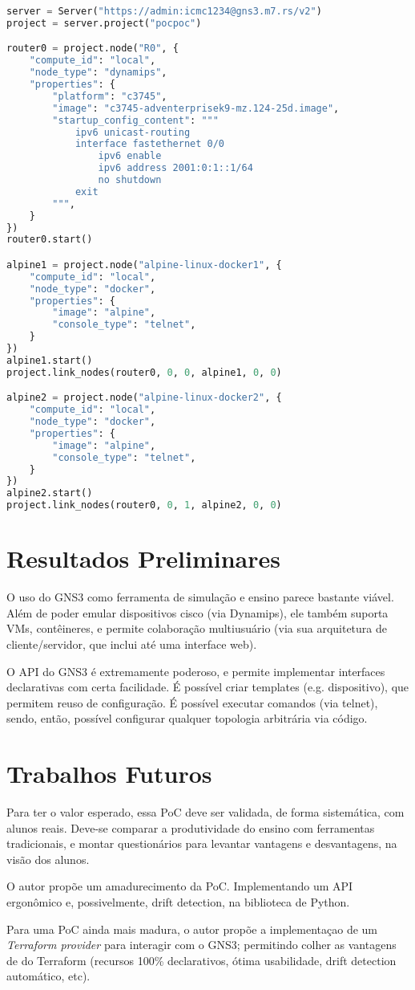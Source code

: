\documentclass[12pt]{article}
\begin{document}
\begin{lstlisting}[language=Python]
server = Server("https://admin:icmc1234@gns3.m7.rs/v2")
project = server.project("pocpoc")

router0 = project.node("R0", {
    "compute_id": "local",
    "node_type": "dynamips",
    "properties": {
        "platform": "c3745",
        "image": "c3745-adventerprisek9-mz.124-25d.image",
        "startup_config_content": """
            ipv6 unicast-routing
            interface fastethernet 0/0
                ipv6 enable
                ipv6 address 2001:0:1::1/64
                no shutdown
            exit
        """,
    }
})
router0.start()

alpine1 = project.node("alpine-linux-docker1", {
    "compute_id": "local",
    "node_type": "docker",
    "properties": {
        "image": "alpine",
        "console_type": "telnet",
    }
})
alpine1.start()
project.link_nodes(router0, 0, 0, alpine1, 0, 0)

alpine2 = project.node("alpine-linux-docker2", {
    "compute_id": "local",
    "node_type": "docker",
    "properties": {
        "image": "alpine",
        "console_type": "telnet",
    }
})
alpine2.start()
project.link_nodes(router0, 0, 1, alpine2, 0, 0)
\end{lstlisting}

\section{Resultados Preliminares}

O uso do GNS3 como ferramenta de simulação e ensino parece bastante viável.
Além de poder emular dispositivos cisco (via Dynamips), ele também suporta VMs,
contêineres, e permite colaboração multiusuário (via sua arquitetura de
cliente/servidor, que inclui até uma interface web).

O API do GNS3 é extremamente poderoso, e permite implementar interfaces
declarativas com certa facilidade. É possível criar templates (e.g.
dispositivo), que permitem reuso de configuração. É possível executar comandos
(via telnet), sendo, então, possível configurar qualquer topologia arbitrária
via código.

\section{Trabalhos Futuros}

Para ter o valor esperado, essa PoC deve ser validada, de forma sistemática,
com alunos reais. Deve-se comparar a produtividade do ensino com ferramentas
tradicionais, e montar questionários para levantar vantagens e desvantagens, na
visão dos alunos.

O autor propõe um amadurecimento da PoC. Implementando um API ergonômico e,
possivelmente, drift detection, na biblioteca de Python.

Para uma PoC ainda mais madura, o autor propõe a implementaçao de um
\textit{Terraform provider} para interagir com o GNS3; permitindo colher as
vantagens de do Terraform (recursos 100\% declarativos, ótima usabilidade,
drift detection automático, etc).



\end{document}

